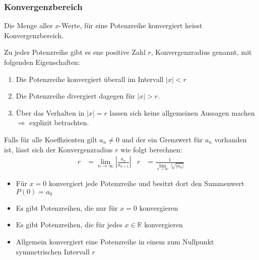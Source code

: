 \subsubsection{Konvergenzbereich}
Die Menge aller $x$-Werte, für eine Potenzreihe konvergiert heisst Konvergenzbereich.

Zu jeder Potenzreihe gibt es ene positive Zahl $r$, Konvergenzradius genannt, mit folgenden Eigenschaften:
\begin{enumerate}\itemsep0em
	\item Die Potenzreihe konvergiert überall im Intervall $|x| < r$
	\item Die Potenzreihe divergiert dagegen für $|x| > r$.
	\item Über das Verhalten in $|x| = r$ lassen sich keine allgemeinen Aussagen machen $\Rightarrow$ explizit betrachten.
\end{enumerate}

Falls für alle Koeffizienten gilt $a_n \neq 0$ und der ein Grenzwert für $a_n$ vorhanden ist, lässt sich
der Konvergenzradius $r$ wie folgt berechnen:
\begin{align*}
	r& = \lim_{n \rightarrow \infty} \left|\frac{a_n}{a_{n+1}}\right| &
	r& = \frac{1}{\lim_{n \rightarrow \infty} \sqrt[n]{|a_n|}}
\end{align*}

\begin{itemize}\itemsep0em
	\item Für $x = 0$ konvergiert jede Potenzreihe und besitzt dort den Summenwert $P(0) = a_0$\\
	\item Es gibt Potenzreihen, die nur für $x = 0$ konvergieren
	\item Es gibt Potenzreihen, die für jedes $x \in \mathbb{R}$ konvergieren
	\item Allgemein konvergiert eine Potenzreihe in einem zum Nullpunkt symmetrischen Intervall $r$
\end{itemize}

